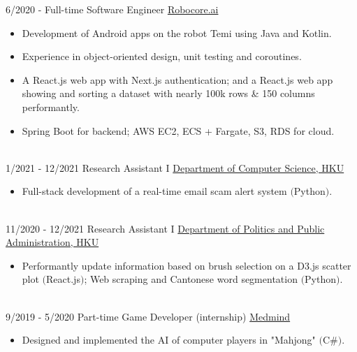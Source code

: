 \documentclass[letterpaper]{twentysecondcv} %
\begin{document}
\begin{twenty}
\twentyitem
    	{6/2020 - }
	{}
         {Full-time Software Engineer}
         {\href{https://www.robocore.ai}{Robocore.ai}}
        {}
        {\vspace{-2mm}\begin{itemize}[topsep=0pt,partopsep=0pt]
				\item Development of Android apps on the robot Temi using \textcolor{pblue}{Java and Kotlin}.
				\item Experience in \textcolor{pblue}{object-oriented design, unit testing and coroutines}.
				\item A \textcolor{pblue}{React.js} web app with Next.js \textcolor{pblue}{authentication}; and a \textcolor{pblue}{React.js} web app \textcolor{pblue}{showing and sorting a dataset with nearly 100k rows \& 150 columns performantly}.
				\item \textcolor{pblue}{Spring Boot} for backend; \textcolor{pblue}{AWS} EC2, ECS + Fargate, S3, RDS for cloud.
				\end{itemize} }\\

\twentyitem
		{1/2021 - 12/2021}
	{}
			{Research Assistant I}
			{\href{https://www.cs.hku.hk}{Department of Computer Science, HKU}}
		{}
		{\vspace{-2mm}\begin{itemize}[topsep=0pt,partopsep=0pt]
				\item Full-stack development of a \textcolor{pblue}{real-time} email scam alert system \textcolor{pblue}{$($Python$)$}.
				\end{itemize} }\\

\twentyitem
		{11/2020 - 12/2021}
	{}
			{Research Assistant I}
			{\href{https://ppaweb.hku.hk}{Department of Politics and Public Administration, HKU}}
		{}
		{\vspace{-2mm}\begin{itemize}[topsep=0pt,partopsep=0pt]
				\item \textcolor{pblue}{Performantly} update information based on brush selection on a D3.js scatter plot \textcolor{pblue}{$($React.js$)$}; Web scraping and Cantonese word segmentation \textcolor{pblue}{$($Python$)$}.
				\end{itemize} }\\

\twentyitem
    	{9/2019 - 5/2020}
		{}
        {Part-time Game Developer (internship)}
        {\href{https://www.medmindtechnology.hk}{Medmind}}
        {}
        {\vspace{-2mm}\begin{itemize}[topsep=0pt,partopsep=0pt]
				\item Designed and implemented the \textcolor{pblue}{AI of computer players in "Mahjong"} $($C\#$)$.
				\end{itemize}} \\
				

\end{twenty}
\end{document}
